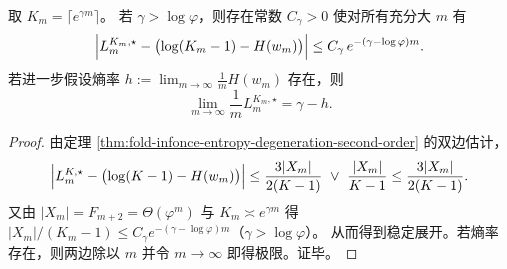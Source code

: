 \begin{corollary}[指数负样本双极限的稳定展开与临界阈值]\label{cor:fold-infonce-exponential-K-stable-expansion}
取 \(K_m=\lceil e^{\gamma m}\rceil\)。
若 \(\gamma>\log\varphi\)，则存在常数 \(C_\gamma>0\) 使对所有充分大 \(m\) 有
\[
\Bigl|L_{m}^{K_m,\star}-\bigl(\log(K_m-1)-H(w_m)\bigr)\Bigr|
\le C_\gamma\,e^{-(\gamma-\log\varphi)m}.
\]
若进一步假设熵率 \(h:=\lim_{m\to\infty}\frac{1}{m}H(w_m)\) 存在，则
\[
\lim_{m\to\infty}\frac{1}{m}L_{m}^{K_m,\star}=\gamma-h.
\]
\end{corollary}
\begin{proof}
由定理 \ref{thm:fold-infonce-entropy-degeneration-second-order} 的双边估计，
\[
\Bigl|L_{m}^{K,\star}-\bigl(\log(K-1)-H(w_m)\bigr)\Bigr|
\le
\frac{3|X_m|}{2(K-1)}\ \vee\ \frac{|X_m|}{K-1}
\le
\frac{3|X_m|}{2(K-1)}.
\]
又由 \(|X_m|=F_{m+2}=\Theta(\varphi^m)\) 与 \(K_m\asymp e^{\gamma m}\) 得
\(
|X_m|/(K_m-1)\le C_\gamma e^{-(\gamma-\log\varphi)m}
\)（\(\gamma>\log\varphi\)）。
从而得到稳定展开。若熵率存在，则两边除以 \(m\) 并令 \(m\to\infty\) 即得极限。证毕。
\end{proof}



\endinput
